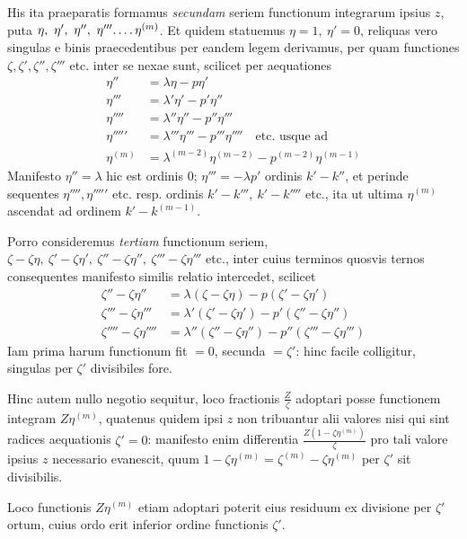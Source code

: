 His ita praeparatis formamus \textit{secundam} seriem functionum integrarum ipsius $z$, puta $\eta,\ \eta',\ \eta'',\ \eta'''\ldotp\ldotp\ldotp\ldotp\eta^{(m)}$. Et quidem statuemus $\eta=1,\ \eta'=0$, reliquas vero
singulas e binis praecedentibus per eandem legem derivamus, per quam functiones $\zeta,\zeta',\zeta'',\zeta'''$ etc. inter se nexae sunt, scilicet per aequationes
\[
\begin{aligned}
\eta''&=\lambda\eta-p\eta'\\
\eta'''&=\lambda'\eta'-p'\eta''\\
\eta''''&=\lambda''\eta''-p''\eta'''\\
\eta'''''&=\lambda'''\eta'''-p'''\eta''''\quad\text{etc. usque ad}\\
\eta^{(m)}&=\lambda^{(m-2)}\eta^{(m-2)}-p^{(m-2)}\eta^{(m-1)}
\end{aligned}
\]
Manifesto $\eta''=\lambda$ hic est ordinis $0$; $\eta'''=-\lambda p'$ ordinis $k'-k''$, et perinde sequentes $\eta'''',\eta'''''$ etc. resp. ordinis $k'-k''',\ k'-k''''$ etc., ita ut ultima $\eta^{(m)}$ ascendat ad ordinem $k'-k^{(m-1)}$.

Porro consideremus \textit{tertiam} functionum seriem, $\zeta-\zeta\eta,\ \zeta'-\zeta\eta',\ \zeta''-\zeta\eta'',\ \zeta'''-\zeta\eta'''$ etc., inter cuius terminos quosvis ternos consequentes manifesto similis relatio intercedet, scilicet
\[
\begin{aligned}
\zeta''-\zeta\eta''&=\lambda(\zeta-\zeta\eta)-p(\zeta'-\zeta\eta')\\
\zeta'''-\zeta\eta'''&=\lambda'(\zeta'-\zeta\eta')-p'(\zeta''-\zeta\eta'')\\
\zeta''''-\zeta\eta''''&=\lambda''(\zeta''-\zeta\eta'')-p''(\zeta'''-\zeta\eta''')
\end{aligned}
\]
Iam prima harum functionum fit $=0$, secunda $=\zeta'$: hinc facile colligitur, singulas per $\zeta'$ divisibiles fore.

Hinc autem nullo negotio sequitur, loco fractionis $\frac Z\zeta$ adoptari posse functionem integram $Z\eta^{(m)}$, quatenus quidem ipsi $z$ non tribuantur alii valores nisi qui sint radices aequationis $\zeta'=0$: manifesto enim differentia $\frac{Z(1-\zeta\eta^{(m)})}{\zeta}$ pro tali valore ipsius $z$ necessario evanescit, quum $1-\zeta\eta^{(m)}=\zeta^{(m)}-\zeta\eta^{(m)}$ per $\zeta'$ sit divisibilis.

Loco functionis $Z\eta^{(m)}$ etiam adoptari poterit eius residuum ex divisione per $\zeta'$ ortum, cuius ordo erit inferior ordine functionis $\zeta'$.

